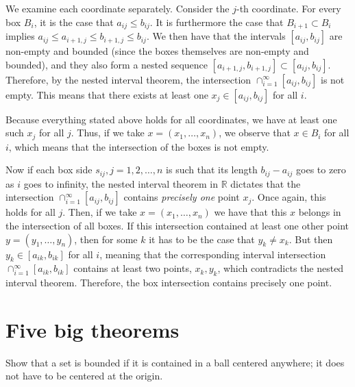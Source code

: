 \begin{solution}

    We examine each coordinate separately. Consider the $j$-th coordinate. For every box $B_i$, it is the case that $a_{ij} \leq b_{ij}$. It is furthermore the case that $B_{i+1} \subset B_i$ implies $a_{ij} \leq a_{i+1, j} \leq b_{i+1, j} \leq b_{ij}$. We then have that the intervals $[a_{ij}, b_{ij}]$ are non-empty and bounded (since the boxes themselves are non-empty and bounded), and they also form a nested sequence $[a_{i+1, j}, b_{i+ 1, j}] \subset [a_{ij}, b_{ij}]$. Therefore, by the nested interval theorem, the intersection $\cap_{i=1}^{\infty} [a_{ij}, b_{ij}]$ is not empty. This means that there exists at least one $x_j \in [a_{ij}, b_{ij}]$ for all $i$. 
    
    Because everything stated above holds for all coordinates, we have at least one such $x_j$ for all $j$. Thus, if we take $x = (x_1, \ldots, x_n)$, we observe that $x \in B_i$ for all $i$, which means that the intersection of the boxes is not empty.

    Now if each box side $s_{ij}, j = 1, 2, \ldots, n$ is such that its length $b_{ij} - a_{ij}$ goes to zero as $i$ goes to infinity, the nested interval theorem in $\mathbb{R}$ dictates that the intersection $\cap_{i=1}^{\infty} [a_{ij}, b_{ij}]$ contains \textit{precisely one} point $x_j$. Once again, this holds for all $j$. Then, if we take $x = (x_1, \ldots, x_n)$ we have that this $x$ belongs in the intersection of all boxes. If this intersection contained at least one other point $y = (y_1, \ldots, y_n)$, then for some $k$ it has to be the case that $y_k \neq x_k$. But then $y_k \in [a_{ik}, b_{ik}]$ for all $i$, meaning that the corresponding interval intersection $\cap_{i=1}^{\infty} [a_{ik}, b_{ik}]$ contains at least two points, $x_k, y_k$, which contradicts the nested interval theorem. Therefore, the box intersection contains precisely one point.
\end{solution}

\section{Five big theorems}

\begin{exercise}{1}
    Show that a set is bounded if it is contained in a ball centered anywhere; it does not have to be centered at the origin.
\end{exercise}

